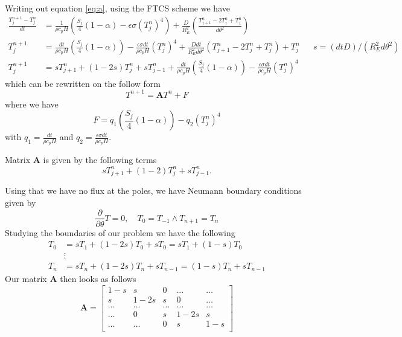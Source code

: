 \documentclass[10pt, a4paper]{amsart}
\begin{document}
Writing out equation \ref{eq:a}, using the FTCS scheme we have 
\begin{align}
	\frac{T_j^{n+1}- T_j^n}{dt} &= \frac{1}{\rho c_pH}\left(\frac{S_j}{4}\left(1-\alpha\right) - \epsilon\sigma \left(T_j^n\right)^4\right) + \frac{D}{R_E^2}\left(\frac{T^n_{j+1}-2T_j^n + T_j^n}{d\theta^2}\right)\\
	T_j^{n+1} &= \frac{dt}{\rho c_pH}\left(\frac{S_j}{4}\left(1-\alpha\right)\right) - \frac{\epsilon\sigma dt}{\rho c_pH} \left(T_j^n\right)^4 + \frac{Ddt}{R_E^2d\theta^2}\left(T^n_{j+1}-2T_j^n + T_j^n\right) + T_j^n && \text{$s = (dt D)/(R_E^2d\theta^2)$}\\
	T_j^{n+1} &= sT_{j+1}^n +(1- 2s)T_j^n + sT_{j-1}^n + \frac{dt}{\rho c_pH}\left(\frac{S_j}{4}\left(1-\alpha\right)\right) - \frac{\epsilon\sigma dt}{\rho c_pH} \left(T_j^n\right)^4\label{eq:A}
\end{align}
which can be rewritten on the follow form 
\begin{equation}
	T^{n+1} = \mathbf{A}T^n + F
\end{equation}
where we have 
\begin{equation}
	F = q_1\left(\frac{S_j}{4}\left(1-\alpha\right)\right) - q_2\left(T_j^n\right)^4
\end{equation}
with $q_1 = \frac{dt}{\rho c_pH}$ and $q_2 = \frac{\epsilon\sigma dt}{\rho c_pH} $.

Matrix $\mathbf{A}$ is given by the following terms 
\begin{equation}
	sT_{j+1}^n +(1- 2)T_j^n + sT_{j-1}^n.
\end{equation}

Using that we have no flux at the poles, we have Neumann boundary conditions given by 
\begin{equation}
	\frac{\partial}{\partial \theta} T = 0, \quad T_0 = T_{-1} \land T_{n+1} = T_n
\end{equation}
Studying the boundaries of our problem we have the following
\begin{align}
	T_0 &= sT_1 + (1-2s)T_0 + sT_0 = sT_1 + (1-s)T_0\\
	&\vdots \\
	T_n &= sT_n + (1-2s)T_n + sT_{n-1} = (1-s)T_n + sT_{n-1}
\end{align}
Our matrix $\mathbf{A}$ then looks as follows 
\begin{equation}
	\mathbf{A} = 
	\begin{bmatrix}
		1 - s & s & 0 & \dots & \dots \\
		s & 1-2s & s & 0 & \dots \\
		\dots & \dots & \dots & \dots & \dots \\
		\dots & 0 & s & 1-2s & s \\
		\dots & \dots & 0 & s & 1-s \\
	\end{bmatrix}\label{mat:A}
\end{equation}
\end{document}
